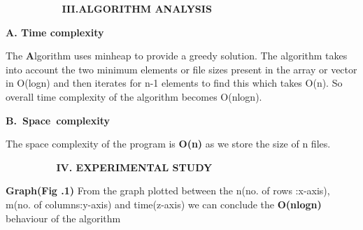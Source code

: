 \documentclass[10pt]{report}
\begin{document}
\begin{multicols}{2}
\vspace{\baselineskip}

\vspace{\baselineskip}
\textbf{\ \ \ \ \ \ \ \ \ \   III.ALGORITHM ANALYSIS}

\vspace{\baselineskip}
\textbf{A. Time complexity}

\vspace{\baselineskip}
The\textbf{ A}lgorithm uses minheap to provide a greedy solution. 
The algorithm takes into account the two minimum elements or file sizes present in the array or vector in O(logn) and then iterates for n-1 elements to find this which takes O(n).
So overall time complexity of the algorithm becomes O(nlogn).

\vspace{\baselineskip}
\textbf{B.\ Space\ complexity\    \ \ \ \ \  }

\vspace{\baselineskip}
The space complexity of the program is \textbf{O(n)} as we store the size of n files.

\vspace{\baselineskip}

\vspace{\baselineskip}

\vspace{\baselineskip}

\vspace{\baselineskip}

\vspace{\baselineskip}

\vspace{\baselineskip}

\vspace{\baselineskip}

\vspace{\baselineskip}

\vspace{\baselineskip}

\vspace{\baselineskip}

\vspace{\baselineskip}
\textbf{\ \ \ \ \ \ \ \  \  IV. EXPERIMENTAL STUDY\  }

\vspace{\baselineskip}
\textbf{Graph(Fig .1) }From the graph plotted between the n(no. of rows :x-axis), m(no. of columns:y-axis) and time(z-axis) we can conclude the \textbf{O(nlogn)} behaviour of the algorithm


\end{multicols}
\end{document}
